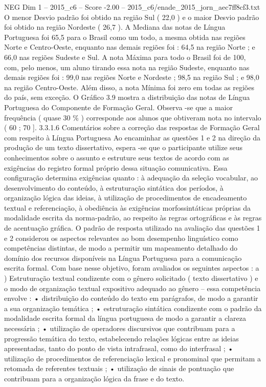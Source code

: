\begin{textsample}{NEG Dim 1 – 2015\_c6 – Score -2.00 – 2015\_c6/enade\_2015\_jorn\_aec7ff8cf3.txt}
O menor Desvio padrão foi obtido na região Sul ( 22,0 ) e o maior Desvio padrão foi obtido na região Nordeste ( 26,7 ).
A Mediana das notas de Língua Portuguesa foi 65,5 para o Brasil como um todo, a mesma obtida nas regiões Norte e Centro-Oeste, enquanto nas demais regiões foi : 64,5 na região Norte ; e 66,0 nas regiões Sudeste e Sul.
A nota Máxima para todo o Brasil foi de 100, com, pelo menos, um aluno tirando essa nota na região Sudeste, enquanto nas demais regiões foi : 99,0 nas regiões Norte e Nordeste ; 98,5 na região Sul ; e 98,0 na região Centro-Oeste.
Além disso, a nota Mínima foi zero em todas as regiões do país, sem exceção.
O Gráfico 3.9 mostra a distribuição das notas de Língua Portuguesa do Componente de Formação Geral.
Observa -se que a maior frequência ( quase 30 \% ) corresponde aos alunos que obtiveram nota no intervalo ( 60 ; 70 ]. 3.3.1.6 Comentários sobre a correção das respostas de Formação Geral com respeito à Língua Portuguesa Ao encaminhar as questões 1 e 2 na direção da produção de um texto dissertativo, espera -se que o participante utilize seus conhecimentos sobre o assunto e estruture seus textos de acordo com as exigências do registro formal próprio dessa situação comunicativa.
Essa configuração determina exigências quanto : à adequação da seleção vocabular, ao desenvolvimento do conteúdo, à estruturação sintática dos períodos, à organização lógica das ideias, à utilização de procedimentos de encadeamento textual e referenciação, à obediência às exigências morfossintáticas próprias da modalidade escrita da norma-padrão, ao respeito às regras ortográficas e às regras de acentuação gráfica.
O padrão de resposta utilizado na avaliação das questões 1 e 2 considerou os aspectos relevantes ao bom desempenho linguístico como competências distintas, de modo a permitir um mapeamento detalhado do domínio dos recursos disponíveis na Língua Portuguesa para a comunicação escrita formal.
Com base nesse objetivo, foram avaliados os seguintes aspectos : a ) Estruturação textual condizente com o gênero solicitado ( texto dissertativo ) e o modo de organização textual expositivo adequado ao gênero – essa competência envolve : • distribuição do conteúdo do texto em parágrafos, de modo a garantir a sua organização temática ; • estruturação sintática condizente com o padrão da modalidade escrita formal da língua portuguesa de modo a garantir a clareza necessária ; • utilização de operadores discursivos que contribuam para a progressão temática do texto, estabelecendo relações lógicas entre as ideias apresentadas, tanto do ponto de vista intrafrasal, como do interfrasal ; • utilização de procedimentos de referenciação lexical e pronominal que permitam a retomada de referentes textuais ; • utilização de sinais de pontuação que contribuam para a organização lógica da frase e do texto.

\end{textsample}
